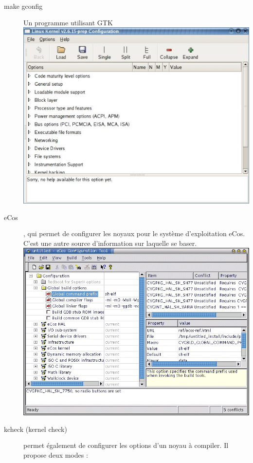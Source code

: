 \documentclass[16pts]{report}
\begin{document}
\begin{description}
    \item[make gconfig] 	    Un programme utilisant GTK \\
        \includegraphics[scale=1]{illustrations/gconfig.jpg} \\
    \item[eCos], qui permet de configurer les noyaux pour le système
        d’exploitation eCos. C’est une autre source d’information
        sur laquelle se baser. \\
        \includegraphics[scale=1.3]{illustrations/eCos_config.png} \pagebreak
    \item[kcheck (kernel check)] permet également de configurer les options d’un noyau
        à compiler.
        Il propose deux modes :


\end{description}
\end{document}
